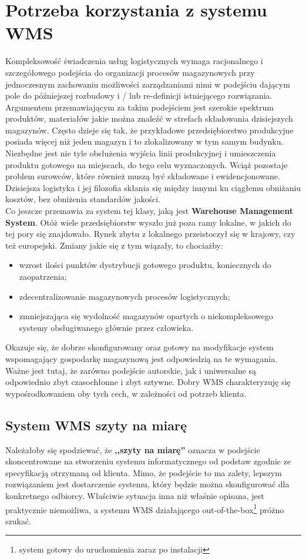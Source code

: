 \section{Potrzeba korzystania z systemu WMS}
	Kompleksowość świadczenia usług logistycznych wymaga racjonalnego i szczegółowego podejścia
	do organizacji procesów magazynowych przy jednoczesnym zachowaniu możliwości zarządzaniami
	nimi w podejściu dającym pole do późniejszej rozbudowy i / lub re-definicji istniejącego
	rozwiązania. Argumentem przemawiającym za takim podejściem jest szerokie spektrum 
	produktów, materiałów jakie można znaleźć w strefach składowania dzisiejszych magazynów.
	Często dzieje się tak, że przykładowe przedsiębiorstwo produkcyjne posiada więcej niż jeden
	magazyn i to zlokalizowany w tym samym budynku. Niezbędne jest nie tyle obsłużenia
	wyjścia linii produkcyjnej i umieszczenia produktu gotowego na miejscach, do tego celu wyznaczonych.
	Wciąż pozostaje problem surowców, które również muszą być składowane i ewidencjonowane. Dzisiejsza
	logistyka i jej filozofia skłania się między innymi ku ciągłemu obniżaniu kosztów, bez obniżenia
	standardów jakości. \\
	
	Co jeszcze przemawia za system tej klasy, jaką jest \textbf{Warehouse Management System}. Otóż 
	wiele przedsiębiorstw wyszło już poza ramy lokalne, w jakich do tej pory się znajdowało. Rynek zbytu
	z lokalnego przeistoczył się w krajowy, czy też europejski. Zmiany jakie się z tym wiązały, to chociażby:
	\begin{itemize}
		\item wzrost ilości punktów dystrybucji gotowego produktu, koniecznych do zaopatrzenia;
		\item zdecentralizowanie magazynowych procesów logistycznych;
		\item zmniejszająca się wydolność magazynów opartych o niekompleksowego systemy
		obsługiwanego głównie przez człowieka.
	\end{itemize}
	Okazuje się, że dobrze skonfigurowany oraz gotowy na modyfikacje system wspomagający gospodarkę magazynową
	jest odpowiedzią na te wymagania. Ważne jest tutaj, że zarówno podejście autorskie, jak i uniwersalne są
	odpowiednio zbyt czasochłonne i zbyt sztywne. Dobry WMS charakteryzuję się wypośrodkowaniem oby tych 
	cech, w zależności od potrzeb klienta. \\
	
	\subsection{System WMS szyty na miarę}
	Należałoby się spodziewać, że \textbf{,,szyty na miarę''} oznacza w podejście skoncentrowane
	na stworzeniu systemu informatycznego od podstaw zgodnie ze specyfikacją otrzymaną od klienta.
	Mimo, że podejście to ma zalety, lepszym rozwiązaniem jest dostarczenie systemu, który 
	będzie można skonfigurować dla konkretnego odbiorcy. Właściwie sytuacja inna niż właśnie opisana,
	jest praktycznie niemożliwa, a systemu WMS działającego out-of-the-box\footnote{system gotowy do
	uruchomienia zaraz po instalacji} próżno szukać.\\

